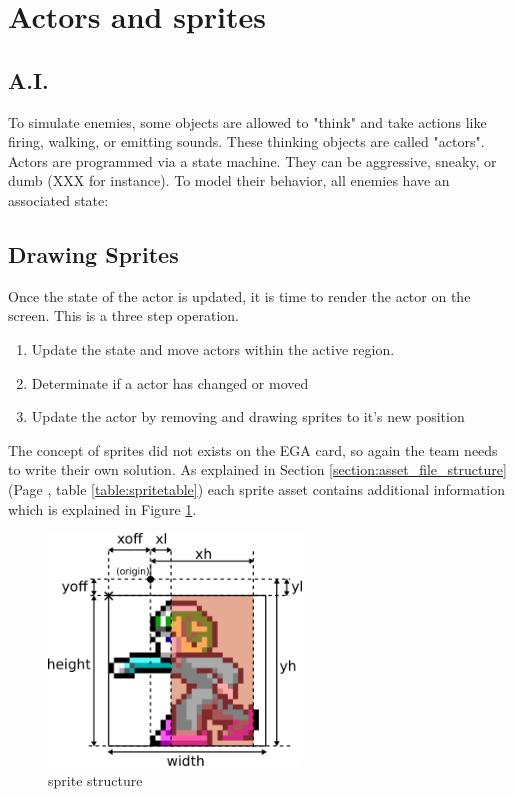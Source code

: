 \documentclass[book.tex]{subfiles}
\begin{document}
\section{Actors and sprites}

\subsection{A.I.}
To simulate enemies, some objects are allowed to "think" and take actions like firing, walking,
or emitting sounds. These thinking objects are called "actors".
Actors are programmed via a state machine. They can be aggressive, sneaky, or dumb
(XXX for instance). To model their behavior, all enemies have an associated state:

\subsection{Drawing Sprites}
\label{section:draw_sprites}
Once the state of the actor is updated, it is time to render the actor on the screen. This is a three step operation.
\begin{enumerate}
\item Update the state and move actors within the active region.
\item Determinate if a actor has changed or moved
\item Update the actor by removing and drawing sprites to it's new position
\end{enumerate}

The concept of sprites did not exists on the EGA card, so again the team needs to write their own solution. As explained in Section \ref{section:asset_file_structure} (Page \pageref{table:spritetable}, table \ref{table:spritetable}) each sprite asset contains additional information which is explained in Figure \ref{fig:sprite_structure}.\\
\begin{figure}[H]
  \centering
  \includegraphics[width=0.6\textwidth]{imgs/drawings/sprite.png}
  \caption{sprite structure}
  \label{fig:sprite_structure}
\end{figure}
\end{document}

